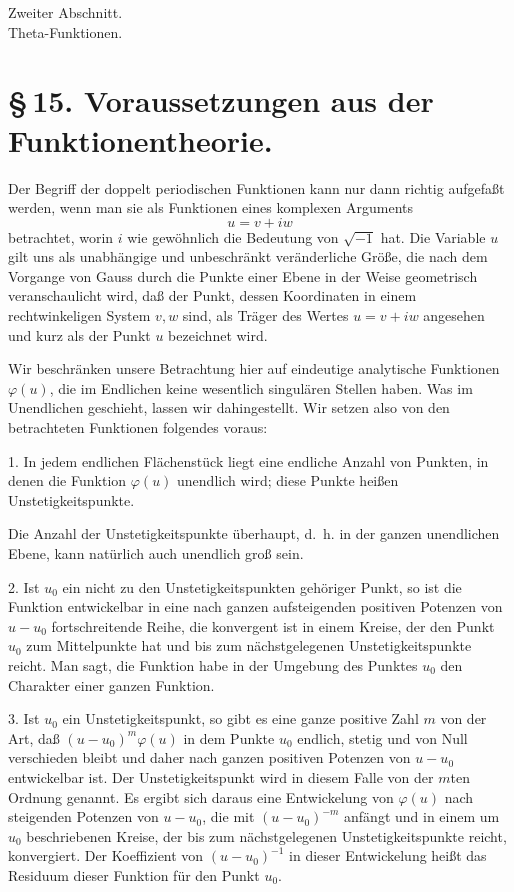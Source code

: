 \documentclass[11pt]{article}
\begin{document}
\begin{center}
{\large Zweiter Abschnitt.}\\[0.7em]
{\Large Theta-Funktionen.}
\end{center}

\section*{\S\,15. Voraussetzungen aus der Funktionentheorie.}

Der Begriff der doppelt periodischen Funktionen kann nur dann richtig aufgefaßt werden, wenn man sie als Funktionen eines komplexen Arguments
\[
u=v+iw
\]
betrachtet, worin $i$ wie gewöhnlich die Bedeutung von $\sqrt{-1}$ hat. Die Variable $u$ gilt uns als unabhängige und unbeschränkt veränderliche Größe, die nach dem Vorgange von Gauss durch die Punkte einer Ebene in der Weise geometrisch veranschaulicht wird, daß der Punkt, dessen Koordinaten in einem rechtwinkeligen System $v,w$ sind, als Träger des Wertes $u=v+iw$ angesehen und kurz als der Punkt $u$ bezeichnet wird.

Wir beschränken unsere Betrachtung hier auf eindeutige analytische Funktionen $\varphi(u)$, die im Endlichen keine wesentlich singulären Stellen haben. Was im Unendlichen geschieht, lassen wir dahingestellt. Wir setzen also von den betrachteten Funktionen folgendes voraus:

1. In jedem endlichen Flächenstück liegt eine endliche Anzahl von Punkten, in denen die Funktion $\varphi(u)$ unendlich wird; diese Punkte heißen Unstetigkeitspunkte.

Die Anzahl der Unstetigkeitspunkte überhaupt, d.\ h. in der ganzen unendlichen Ebene, kann natürlich auch unendlich groß sein.

2. Ist $u_0$ ein nicht zu den Unstetigkeitspunkten gehöriger Punkt, so ist die Funktion entwickelbar in eine nach ganzen aufsteigenden positiven Potenzen von $u-u_0$ fortschreitende Reihe, die konvergent ist in einem Kreise, der den Punkt $u_0$ zum Mittelpunkte hat und bis zum nächstgelegenen Unstetigkeitspunkte reicht. Man sagt, die Funktion habe in der Umgebung des Punktes $u_0$ den Charakter einer ganzen Funktion.

3. Ist $u_0$ ein Unstetigkeitspunkt, so gibt es eine ganze positive Zahl $m$ von der Art, daß $(u-u_0)^m\varphi(u)$ in dem Punkte $u_0$ endlich, stetig und von Null verschieden bleibt und daher nach ganzen positiven Potenzen von $u-u_0$ entwickelbar ist. Der Unstetigkeitspunkt wird in diesem Falle von der $m$ten Ordnung genannt. Es ergibt sich daraus eine Entwickelung von $\varphi(u)$ nach steigenden Potenzen von $u-u_0$, die mit $(u-u_0)^{-m}$ anfängt und in einem um $u_0$ beschriebenen Kreise, der bis zum nächstgelegenen Unstetigkeitspunkte reicht, konvergiert. Der Koeffizient von $(u-u_0)^{-1}$ in dieser Entwickelung heißt das Residuum dieser Funktion für den Punkt $u_0$.
\end{document}
